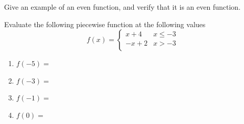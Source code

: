 \documentclass[addpoints,12pt]{exam}
\begin{document}
\begin{questions}
\question Give an example of an even function, and verify that it is an even function. 

\question Evaluate the following piecewise function at the following values
\[
	f(x) =
	\begin{cases}
   x+4 & x\leq -3 \\
	 -x+2 & x> -3 \\
	\end{cases}
\]

\begin{enumerate}
    \item $f(-5)=$
		\item $f(-3) = $
		\item $f(-1)= $
		\item $f(0)=$
\end{enumerate}

\end{questions}
\end{document}

